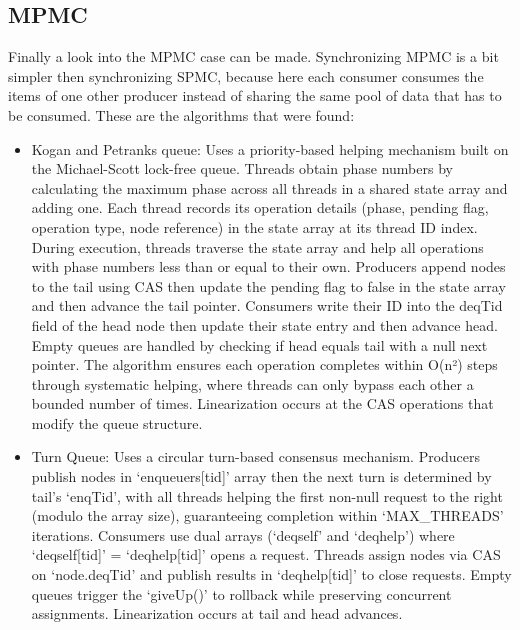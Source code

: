 \subsection{\acf{MPMC}}\label{subsec:multiple-producer-and-multiple-consumer}
Finally a look into the \ac{MPMC} case can be made. Synchronizing \ac{MPMC} is a bit simpler then synchronizing \ac{SPMC}, because here each consumer consumes the items of one other producer instead of sharing the same pool of data that has to be consumed. These are the algorithms that were found:
\begin{itemize}
   \item  Kogan and Petranks queue: Uses a priority-based helping mechanism built on the Michael-Scott lock-free queue. Threads obtain phase numbers by calculating the maximum phase across all threads in a shared state array and adding one. Each thread records its operation details (phase, pending flag, operation type, node reference) in the state array at its thread ID index. During execution, threads traverse the state array and help all operations with phase numbers less than or equal to their own. Producers append nodes to the tail using \ac{CAS} then update the pending flag to false in the state array and then advance the tail pointer. Consumers write their ID into the deqTid field of the head node then update their state entry and then advance head. Empty queues are handled by checking if head equals tail with a null next pointer. The algorithm ensures each operation completes within O(n²) steps through systematic helping, where threads can only bypass each other a bounded number of times. Linearization occurs at the \ac{CAS} operations that modify the queue structure. \cite{Kogan2011WaitFreeQueues}
   \item Turn Queue: Uses a circular turn-based consensus mechanism. Producers publish nodes in \enquote*{enqueuers[tid]} array then the next turn is determined by tail's \enquote*{enqTid}, with all threads helping the first non-null request to the right (modulo the array size), guaranteeing completion within \enquote*{MAX\_THREADS} iterations. Consumers use dual arrays (\enquote*{deqself} and \enquote*{deqhelp}) where \enquote*{deqself[tid]} = \enquote*{deqhelp[tid]} opens a request. Threads assign nodes via \ac{CAS} on \enquote*{node.deqTid} and publish results in \enquote*{deqhelp[tid]} to close requests. Empty queues trigger the \enquote*{giveUp()} to rollback while preserving concurrent assignments. Linearization occurs at tail and head advances. \cite{RamalheteQueue}

\end{itemize}
